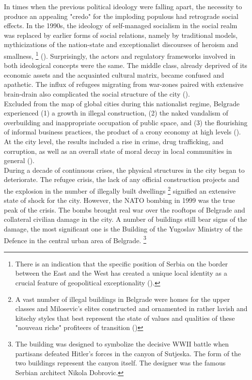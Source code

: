 \documentclass[11pt]{report}
\begin{document}
In times when the previous political ideology were falling apart, the necessity to produce an appealing "credo" for the imploding populous had retrograde social effects. In the 1990s, the ideology of self-managed socialism in the social realm was replaced by earlier forms of social relations, namely by traditional models, mythicizations of the nation-state and exceptionalist discourses of heroism and smallness,
\footnote{There is an indication that the specific position of Serbia on the border between the East and the West has created a unique local identity as a crucial feature of geopolitical exceptionality (\href{Savic}{\citealt{savic_where_2014}}).}
(\href{Doytchinov}{\citealt{doytchinov_belgrade_2015}}). 
Surprisingly, the actors and regulatory frameworks involved in both ideological concepts were the same.
The middle class, already deprived of its economic assets and the acquainted cultural matrix, became confused and apathetic.
The influx of refugees migrating from war-zones paired with extensive brain-drain also complicated the social structure of the city (\href{Doytchinov}{\citealt{doytchinov_urban_2015}}).
\\

Excluded from the map of global cities during this nationalist regime, Belgrade experienced (1) a growth in illegal construction, (2) the naked vandalism of overbuilding and inappropriate occupation of public space, and (3) the flourishing of informal business practices, the product of a crony economy at high levels (\href{Norris}{\citealt{norris_belgrade_2008}}).
At the city level, the results included a rise in crime, drug trafficking, and corruption, as well as an overall state of moral decay in local communities in general  (\href{Prodanovic}{\citealt{prodanovic_stariji_2004}}).
\\

During a decade of continuous crises, the physical structures in the city began to deteriorate.
The refugee crisis, the lack of any official construction projects and the explosion in the number of illegally built dwellings
\footnote{A vast number of illegal buildings in Belgrade were homes for the upper classes and Milosevic's elites constructed and ornamented in rather lavish and kitschy styles that best represent the state of values and qualities of these "nouveau riche" profiteers of transition (\href{Hirt}{\citealt{hirt_belgrade_2009}})}
signified an extensive state of shock for the city.
However, the NATO bombing in 1999 was the true peak of the crisis. The bombs brought real war over the rooftops of Belgrade and collateral civilian damage in the city. A number of buildings still bear signs of the damage, the most significant one is the Building of the Yugoslav Ministry of the Defence in the central urban area of Belgrade. 
\footnote{The building was designed to symbolize the decisive WWII battle when partisans defeated Hitler’s forces in the canyon of Sutjeska. The form of the two buildings represent the canyon itself. The designer was the famous Serbian architect Nikola Dobrovic.}
\\
\end{document}

